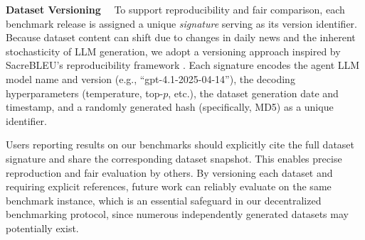 \documentclass[11pt]{article}
\begin{document}
\textbf{Dataset Versioning} \ \
To support reproducibility and fair comparison, each benchmark release is assigned a unique \emph{signature} serving as its version identifier. Because dataset content can shift due to changes in daily news and the inherent stochasticity of LLM generation, we adopt a versioning approach inspired by SacreBLEU’s reproducibility framework \citep{post-2018-call}. Each signature encodes the agent LLM model name and version (e.g., “gpt-4.1-2025-04-14”), the decoding hyperparameters (temperature, top-$p$, etc.), the dataset generation date and timestamp, and a randomly generated hash (specifically, MD5) as a unique identifier.

Users reporting results on our benchmarks should explicitly cite the full dataset signature and share the corresponding dataset snapshot. This enables precise reproduction and fair evaluation by others.
By versioning each dataset and requiring explicit references, future work can reliably evaluate on the same benchmark instance, which is an essential safeguard in our decentralized benchmarking protocol, since numerous independently generated datasets may potentially exist.
\end{document}

